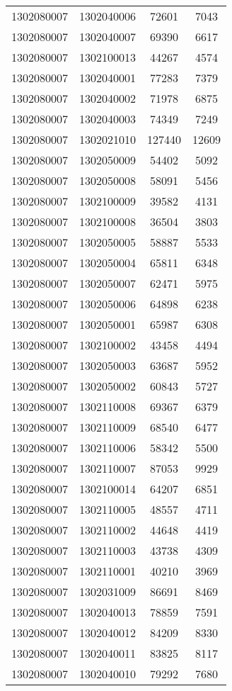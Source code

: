 \begin{longtable}{llcc}
1302080007 & 1302040006 & 72601 & 7043\\
1302080007 & 1302040007 & 69390 & 6617\\
1302080007 & 1302100013 & 44267 & 4574\\
1302080007 & 1302040001 & 77283 & 7379\\
1302080007 & 1302040002 & 71978 & 6875\\
1302080007 & 1302040003 & 74349 & 7249\\
1302080007 & 1302021010 & 127440 & 12609\\
1302080007 & 1302050009 & 54402 & 5092\\
1302080007 & 1302050008 & 58091 & 5456\\
1302080007 & 1302100009 & 39582 & 4131\\
1302080007 & 1302100008 & 36504 & 3803\\
1302080007 & 1302050005 & 58887 & 5533\\
1302080007 & 1302050004 & 65811 & 6348\\
1302080007 & 1302050007 & 62471 & 5975\\
1302080007 & 1302050006 & 64898 & 6238\\
1302080007 & 1302050001 & 65987 & 6308\\
1302080007 & 1302100002 & 43458 & 4494\\
1302080007 & 1302050003 & 63687 & 5952\\
1302080007 & 1302050002 & 60843 & 5727\\
1302080007 & 1302110008 & 69367 & 6379\\
1302080007 & 1302110009 & 68540 & 6477\\
1302080007 & 1302110006 & 58342 & 5500\\
1302080007 & 1302110007 & 87053 & 9929\\
1302080007 & 1302100014 & 64207 & 6851\\
1302080007 & 1302110005 & 48557 & 4711\\
1302080007 & 1302110002 & 44648 & 4419\\
1302080007 & 1302110003 & 43738 & 4309\\
1302080007 & 1302110001 & 40210 & 3969\\
1302080007 & 1302031009 & 86691 & 8469\\
1302080007 & 1302040013 & 78859 & 7591\\
1302080007 & 1302040012 & 84209 & 8330\\
1302080007 & 1302040011 & 83825 & 8117\\
1302080007 & 1302040010 & 79292 & 7680\\

\end{longtable}
